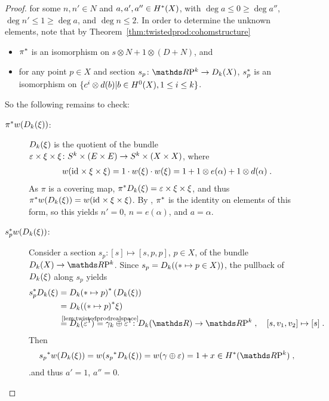\begin{Cor}
\begin{proof}
    for some $n,n'\in N$ and $a,a',a''\in H^*(X)$,
    with $\deg a\leq 0\geq\deg a''$, $\deg n'\leq1\geq\deg a$, and
    $\deg n\leq 2$.
    In order to determine the unknown elements,
    note that by Theorem~\ref{thm:twistedprod:cohomstructure}
    \begin{itemize}
    \item ${\pi}^*$ is an isomorphism on $s\otimes N+1\otimes(D+N)$, and
    \item for any point $p\in X$ and section $s_p\colon\RP
      k\to\Twistedprod{k}{X}$, ${s}^*_p$ is an isomorphism on
      $\{c^i\otimes d(b)|b\in H^0(X), 1\leq i\leq k\}$.
    \end{itemize}
    So the following remains to check:
    \begin{description}
    \item[${\pi}^*{w}(D_{k}({\xi}))$:]
      $D_{k}({\xi})$ is the quotient of the bundle
      $\varepsilon\times\xi\times\xi\colon
      S^{k}\times(E\times E)\to S^{k}\times(X\times X)$, where
      \begin{gather*}
        {w}(\mathrm{id}_{}\times\xi\times\xi)
        = 1\cdot {w}(\xi)\cdot{w}(\xi)
        = 1 + 1\otimes e(\alpha) + 1\otimes d(\alpha)
        \;.
      \end{gather*}
      As $\pi$ is a covering map,
      ${\pi}^*D_{k}({\xi})=\varepsilon\times\xi\times\xi$,
      and thus
      ${\pi}^*{w}(D_{k}({\xi}))={w}(\mathrm{id}_{}\times\xi\times\xi)$.
      By
      ,
      ${\pi}^*$ is the identity on
      elements of this form, so this yields
      $n'=0$, $n=e(\alpha)$, and $a=\alpha$.
    \item[${s}^*_p {w}(D_{k}({\xi}))$:]
      Consider a section $s_p\colon [s]\mapsto [s,p,p]$, $p\in X$, of
      the bundle $\Twistedprod k X\to\RP k$. Since
      $s_p=D_{k}({(\ast\mapsto p\in X)})$,
      the pullback of $D_{k}({\xi})$ along $s_p$ yields
      \begin{align*}
        \pb s_p\Twistedprod{k}{\xi}
        &= \pb{\Twistedprod{k}{\ast\mapsto p}}
          \left(\Twistedprod{k}{\xi}\right) \\
        &= \Twistedprod{k}{\pb{(\ast\mapsto p)}\xi} \\
        &= \Twistedprod{k}{\trivbdl^1}
          \cequalsby{\ref{lem:twistedprodrealspace}}
          \gamma_k\oplus\trivbdl^1
          \colon
          \Twistedprod{k}{\R} \to \RP k\;,\quad
          [s, v_1,v_2] \mapsto [s]
          \;.
      \end{align*}
      Then
      \begin{gather*}
        \pb{s_p}\W{\Twistedprod{k}{\xi}}
        = \W{\pb{s_p}\Twistedprod{k}{\xi}}
        = \W{\gamma\oplus\trivbdl}
        = 1+x\in\H^*(\RP k)
        \;,
      \end{gather*}
      .and thus $a'=1$, $a''=0$.
      \qedhere
    \end{description}
  \end{proof}
\end{Cor}

